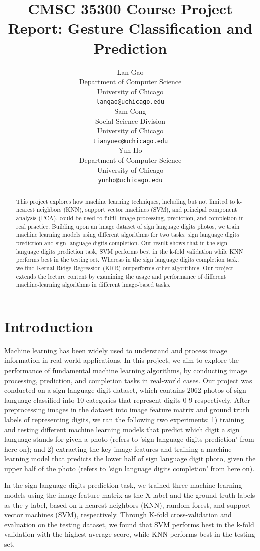\documentclass{article}
\title{CMSC 35300 Course Project Report: Gesture Classification and Prediction}
\author{
  Lan Gao \\
  Department of Computer Science \\
  University of Chicago \\
  \texttt{langao@uchicago.edu} \\
  \And
  Sam Cong \\
  Social Science Division \\
  University of Chicago \\
  \texttt{tianyuec@uchicago.edu} \\
  \And
  Yun Ho \\
  Department of Computer Science \\
  University of Chicago \\
  \texttt{yunho@uchicago.edu} \\
}
\begin{document}
\maketitle


\begin{abstract}
  This project explores how machine learning techniques, including but not limited to k-nearest neighbors (KNN), support vector machines (SVM), and principal component analysis (PCA), could be used to fulfill image processing, prediction, and completion in real practice. Building upon an image dataset of sign language digits photos, we train machine learning models using different algorithms for two tasks: sign language digits prediction and sign language digits completion. Our result shows that in the sign language digits prediction task, SVM performs best in the k-fold validation while KNN performs best in the testing set. Whereas in the sign language digits completion task, we find Kernal Ridge Regression (KRR) outperforms other algorithms. Our project extends the lecture content by examining the usage and performance of different machine-learning algorithms in different image-based tasks.
\end{abstract}


\section{Introduction}
Machine learning has been widely used to understand and process image information in real-world applications. In this project, we aim to explore the performance of fundamental machine learning algorithms, by conducting image processing, prediction, and completion tasks in real-world cases. Our project was conducted on a sign language digit dataset, which contains 2062 photos of sign language classified into 10 categories that represent digits 0-9 respectively. After preprocessing images in the dataset into image feature matrix and ground truth labels of representing digits, we ran the following two experiments: 1) training and testing different machine learning models that predict which digit a sign language stands for given a photo (refers to 'sign language digits prediction' from here on); and 2) extracting the key image features and training a machine learning model that predicts the lower half of sign language digit photo, given the upper half of the photo (refers to 'sign language digits completion' from here on).

In the sign language digits prediction task, we trained three machine-learning models using the image feature matrix as the X label and the ground truth labels as the y label, based on k-nearest neighbors (KNN), random forest, and support vector machines (SVM), respectively. Through K-fold cross-validation and evaluation on the testing dataset, we found that SVM performs best in the k-fold validation with the highest average score, while KNN performs best in the testing set.
\end{document}

